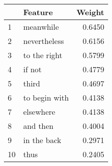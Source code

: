 \begin{tabular}{llr}
\toprule
{} &        Feature &  Weight \\
\midrule
1  &      meanwhile &  0.6450 \\
2  &   nevertheless &  0.6156 \\
3  &   to the right &  0.5799 \\
4  &         if not &  0.4779 \\
5  &          third &  0.4697 \\
6  &  to begin with &  0.4138 \\
7  &      elsewhere &  0.4138 \\
8  &       and then &  0.4004 \\
9  &    in the back &  0.2971 \\
10 &           thus &  0.2405 \\
\bottomrule
\end{tabular}
